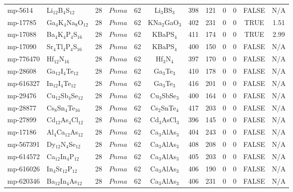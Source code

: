{\begin{longtable}{llcccccccccc}
    mp-5614 & Li$_{12}$B$_{4}$S$_{12}$ & 28    & $Pnma$ & 62    & Li$_{3}$BS$_{3}$ & 398   & 121   & 0     & 0     & FALSE & N/A \\
    mp-17785 & Ga$_{4}$K$_{4}$Na$_{8}$O$_{12}$ & 28    & $Pnma$ & 62    & KNa$_{2}$GaO$_{3}$ & 402   & 231   & 0     & 0     & TRUE  & 1.51  \\
    mp-17088 & Ba$_{4}$K$_{4}$P$_{4}$S$_{16}$ & 28    & $Pnma$ & 62    & KBaPS$_{4}$ & 411   & 174   & 0     & 0     & TRUE  & 2.99  \\
    mp-17090 & Sr$_{4}$Tl$_{4}$P$_{4}$S$_{16}$ & 28    & $Pnma$ & 62    & KBaPS$_{4}$ & 400   & 150   & 0     & 0     & FALSE & N/A \\
    mp-776470 & Hf$_{12}$N$_{16}$ & 28    & $Pnma$ & 62    & Hf$_{3}$N$_{4}$ & 397   & 170   & 0     & 0     & FALSE & N/A \\
    mp-28608 & Ga$_{12}$I$_{4}$Te$_{12}$ & 28    & $Pnma$ & 62    & Ga$_{3}$Te$_{3}$ & 410   & 178   & 0     & 0     & FALSE & N/A \\
    mp-616327 & In$_{12}$I$_{4}$Te$_{12}$ & 28    & $Pnma$ & 62    & Ga$_{3}$Te$_{3}$ & 416   & 201   & 0     & 0     & FALSE & N/A \\
    mp-29476 & Cu$_{12}$Sb$_{4}$Se$_{12}$ & 28    & $Pnma$ & 62    & Cu$_{3}$SbSe$_{3}$ & 400   & 164   & 0     & 0     & FALSE & N/A \\
    mp-28877 & Cs$_{8}$Sn$_{4}$Te$_{16}$ & 28    & $Pnma$ & 62    & Cs$_{2}$SnTe$_{4}$ & 417   & 203   & 0     & 0     & FALSE & N/A \\
    mp-27899 & Cd$_{12}$As$_{4}$Cl$_{12}$ & 28    & $Pnma$ & 62    & Cd$_{3}$AsCl$_{3}$ & 396   & 145   & 0     & 0     & FALSE & N/A \\
    mp-17186 & Al$_{4}$Ca$_{12}$As$_{12}$ & 28    & $Pnma$ & 62    & Ca$_{3}$AlAs$_{3}$ & 404   & 243   & 0     & 0     & FALSE & N/A \\
    mp-567391 & Dy$_{12}$N$_{4}$Se$_{12}$ & 28    & $Pnma$ & 62    & Ca$_{3}$AlAs$_{3}$ & 408   & 208   & 0     & 0     & FALSE & N/A \\
    mp-614572 & Ca$_{12}$In$_{4}$P$_{12}$ & 28    & $Pnma$ & 62    & Ca$_{3}$AlAs$_{3}$ & 405   & 203   & 0     & 0     & FALSE & N/A \\
    mp-616026 & In$_{4}$Sr$_{12}$P$_{12}$ & 28    & $Pnma$ & 62    & Ca$_{3}$AlAs$_{3}$ & 406   & 190   & 0     & 0     & FALSE & N/A \\
    mp-620346 & Ba$_{12}$In$_{4}$As$_{12}$ & 28    & $Pnma$ & 62    & Ca$_{3}$AlAs$_{3}$ & 406   & 231   & 0     & 0     & FALSE & N/A \\

\end{longtable}}
